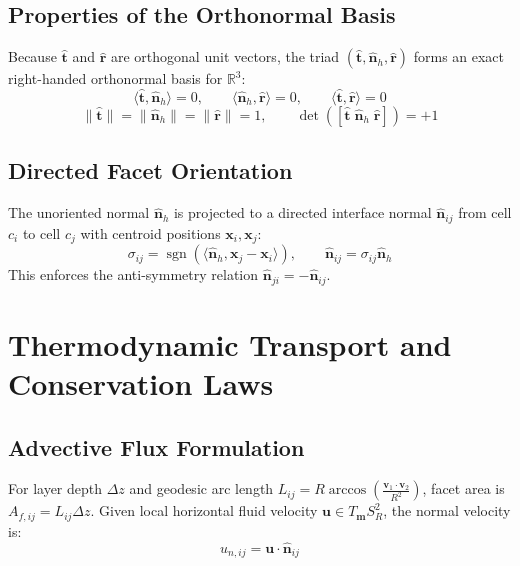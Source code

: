 \documentclass[11pt,a4paper]{article}
\begin{document}
\subsection{Properties of the Orthonormal Basis}
Because $\hat{\mathbf{t}}$ and $\hat{\mathbf{r}}$ are orthogonal unit vectors, the triad $(\hat{\mathbf{t}}, \hat{\mathbf{n}}_h, \hat{\mathbf{r}})$ forms an exact right-handed orthonormal basis for $\mathbb{R}^3$:
\begin{equation}
\langle \hat{\mathbf{t}}, \hat{\mathbf{n}}_h \rangle = 0, \qquad \langle \hat{\mathbf{n}}_h, \hat{\mathbf{r}} \rangle = 0, \qquad \langle \hat{\mathbf{t}}, \hat{\mathbf{r}} \rangle = 0
\end{equation}
\begin{equation}
\|\hat{\mathbf{t}}\| = \|\hat{\mathbf{n}}_h\| = \|\hat{\mathbf{r}}\| = 1, \qquad \det([\hat{\mathbf{t}} \; \hat{\mathbf{n}}_h \; \hat{\mathbf{r}}]) = +1
\end{equation}

\subsection{Directed Facet Orientation}
The unoriented normal $\hat{\mathbf{n}}_h$ is projected to a directed interface normal $\hat{\mathbf{n}}_{ij}$ from cell $c_i$ to cell $c_j$ with centroid positions $\mathbf{x}_i, \mathbf{x}_j$:
\begin{equation}
\sigma_{ij} = \operatorname{sgn}(\langle \hat{\mathbf{n}}_h, \mathbf{x}_j - \mathbf{x}_i \rangle), \qquad \hat{\mathbf{n}}_{ij} = \sigma_{ij} \hat{\mathbf{n}}_h
\end{equation}
This enforces the anti-symmetry relation $\hat{\mathbf{n}}_{ji} = -\hat{\mathbf{n}}_{ij}$.

\section{Thermodynamic Transport and Conservation Laws}

\subsection{Advective Flux Formulation}
For layer depth $\Delta z$ and geodesic arc length $L_{ij} = R \arccos\left(\frac{\mathbf{v}_1 \cdot \mathbf{v}_2}{R^2}\right)$, facet area is $A_{f, ij} = L_{ij} \Delta z$. Given local horizontal fluid velocity $\mathbf{u} \in T_{\mathbf{m}}S^2_R$, the normal velocity is:
\begin{equation}
u_{n, ij} = \mathbf{u} \cdot \hat{\mathbf{n}}_{ij}
\end{equation}
\end{document}
